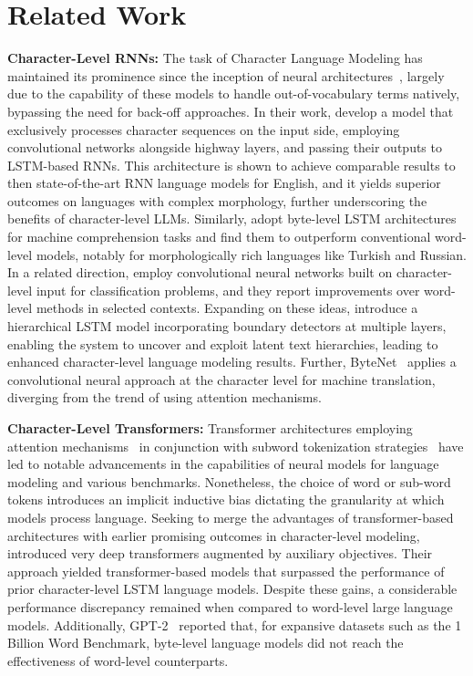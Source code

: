 \section{Related Work}
\label{section:related_work}

\textbf{Character-Level RNNs:} The task of Character Language Modeling has maintained its prominence since the inception of neural architectures~\citep{sutskever2011generating,mikolov2012subword,graves2013generating}, largely due to the capability of these models to handle out-of-vocabulary terms natively, bypassing the need for back-off approaches. In their work, \cite{kim2016character} develop a model that exclusively processes character sequences on the input side, employing convolutional networks alongside highway layers, and passing their outputs to LSTM-based RNNs. This architecture is shown to achieve comparable results to then state-of-the-art RNN language models for English, and it yields superior outcomes on languages with complex morphology, further underscoring the benefits of character-level LLMs. Similarly, \cite{kenter2018byte} adopt byte-level LSTM architectures for machine comprehension tasks and find them to outperform conventional word-level models, notably for morphologically rich languages like Turkish and Russian. In a related direction, \cite{zhang2015character} employ convolutional neural networks built on character-level input for classification problems, and they report improvements over word-level methods in selected contexts. Expanding on these ideas, \citet{chung2019hierarchical} introduce a hierarchical LSTM model incorporating boundary detectors at multiple layers, enabling the system to uncover and exploit latent text hierarchies, leading to enhanced character-level language modeling results. Further, ByteNet~\cite{kalchbrenner2016neural} applies a convolutional neural approach at the character level for machine translation, diverging from the trend of using attention mechanisms.

\textbf{Character-Level Transformers:} Transformer architectures employing attention mechanisms~\citep{vaswani2017attention} in conjunction with subword tokenization strategies~\citep{sennrich-etal-2016-neural} have led to notable advancements in the capabilities of neural models for language modeling and various benchmarks. Nonetheless, the choice of word or sub-word tokens introduces an implicit inductive bias dictating the granularity at which models process language. Seeking to merge the advantages of transformer-based architectures with earlier promising outcomes in character-level modeling, \citet{al2019character} introduced very deep transformers augmented by auxiliary objectives. Their approach yielded transformer-based models that surpassed the performance of prior character-level LSTM language models. Despite these gains, a considerable performance discrepancy remained when compared to word-level large language models. Additionally, GPT-2~\citep{radfordgpt2} reported that, for expansive datasets such as the 1 Billion Word Benchmark, byte-level language models did not reach the effectiveness of word-level counterparts.

